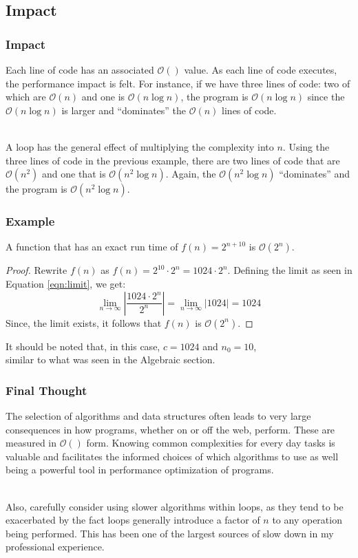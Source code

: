 \documentclass[aspectratio=169]{beamer}
\begin{document}
\subsection{Impact}
\begin{frame}
\frametitle{Impact}
Each line of code has an associated $\mathcal{O}()$ value. As each line of code executes, the performance impact is felt. For instance, if we have three lines of code: two of which are $\mathcal{O}(n)$ and one is $\mathcal{O}(n \log n)$, the program is $\mathcal{O}(n \log n)$ since the $\mathcal{O}(n \log n)$ is larger and ``dominates'' the $\mathcal{O}(n)$ lines of code.

\mbox{}\\
\pause
A loop has the general effect of multiplying the complexity into $n$. Using the three lines of code in the previous example, there are two lines of code that are $\mathcal{O}(n^2)$ and one that is $\mathcal{O}(n^2 \log n)$. Again, the $\mathcal{O}(n^2 \log n)$ ``dominates'' and the program is $\mathcal{O}(n^2 \log n)$.
\end{frame}

\begin{frame}
\frametitle{Example}
\begin{theorem}
A function that has an exact run time of $f(n) = 2^{n + 10}$ is $\mathcal{O}(2^n)$.
\end{theorem}
\begin{proof}
Rewrite $f(n)$ as $f(n) = 2^{10} \cdot 2^n = 1024 \cdot 2^n$. Defining the limit as seen in Equation \ref{eqn:limit}, we get:
\[
\lim_{n \rightarrow \infty} \left| \frac{1024 \cdot 2^n}{2^n} \right| = \lim_{n \rightarrow \infty} \left| 1024 \right| = 1024
\]
Since, the limit exists, it follows that $f(n)$ is $\mathcal{O}(2^n)$.
\end{proof}
It should be noted that, in this case, $c = 1024$ and $n_0 = 10$,\\
similar to what was seen in the Algebraic section.
\end{frame}

\begin{frame}
\frametitle{Final Thought}
The selection of algorithms and data structures often leads to very large consequences in how programs, whether on or off the web, perform. These are measured in $\mathcal{O}()$ form. Knowing common complexities for every day tasks is valuable and facilitates the informed choices of which algorithms to use as well being a powerful tool in performance optimization of programs.

\mbox{}\\
Also, carefully consider using slower algorithms within loops, as they tend to be exacerbated by the fact loops generally introduce a factor of $n$ to any operation being performed. This has been one of the largest sources of slow down in my professional experience.
\end{frame}
\end{document}
